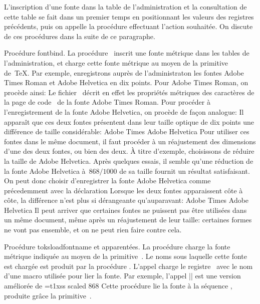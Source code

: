 \formalpar
L'inscription d'une fonte dans la table de l'administration et la
consultation de cette table se fait dans un premier temps en
positionnant les valeurs des registres précédents, puis on appelle la
procédure effectuant l'action souhaitée. On discute de ces
procédures dans la suite de ce paragraphe.

\formalpar Procédure fontbind.
La procédure~ inscrit une fonte métrique dans les tables
de l'administration, et charge cette fonte métrique au moyen de la
primitive~ de~\TeX. Par exemple, enregistrons auprès de
l'administraton les fontes Adobe Times Roman et Adobe Helvetica en dix
points. Pour Adobe Times Roman, on procède ainsi:
\beginverbatim
{}
\endverbatim
Le fichier~ décrit en effet les propriétés métriques des
caractères de la page de code~ de la fonte Adobe Times Roman.
Pour procéder à l'enregistrement de la fonte Adobe Helvetica, on
procède de façon analogue:
\beginverbatim
{}
\endverbatim
Il apparaît que ces deux fontes présentent dans leur taille optique de
dix points une différence de taille considérable:
\begindisplay
\Times Adobe Times\quad
\Helvetica Adobe Helvetica
\enddisplay
Pour utiliser ces fontes dans le même document, il faut procéder à un
réajustement des dimensions d'une des deux fontes, ou bien des deux. À
titre d'exemple, choisissons de réduire la taille de Adobe
Helvetica. Après quelques essais, il semble qu'une réduction de la
fonte Adobe Helvetica à~$868/1000$ de sa taille fournit un résultat
satisfaisant. On peut donc choisir d'enregistrer la fonte Adobe
Helvetica comme précedemment avec la déclaration
\beginverbatim
{}
\endverbatim
Lorsque les deux fontes apparaissent côte à côte, la différence n'est
plus si dérangeante qu'auparavant:
\begindisplay
\Times Adobe Times\quad
\AltHelvetica Adobe Helvetica
\enddisplay
Il peut arriver que certaines fontes ne puissent pas être utilisées
dans un même document, même après un réajustement de leur taille:
certaines formes ne vont pas ensemble, et on ne peut rien faire contre
cela.

\formalpar Procédure toksloadfontname et apparentées.
La procédure  charge la fonte métrique indiquée au moyen
de la primitive~. Le noms sous laquelle cette fonte est
chargée est produit par la procédure . L'appel
\beginverbatim
\toksloadfontname\rtA
\endverbatim
charge le registre~ avec le nom d'une macro utilisée pour lier
la fonte. Par exemple, l'appel || est une
version améliorée de
\beginverbatim
\toksloadfontname\rtA
\expandafter\font\the\rtA=t1xss scaled 868
\endverbatim
Cette procédure lie la fonte  à la séquence
\li{%
  \setAltHelvetica
  \toksloadfontname\rtA
  \expandafter\string\the\rtA
}, produite grâce la primitive~.

